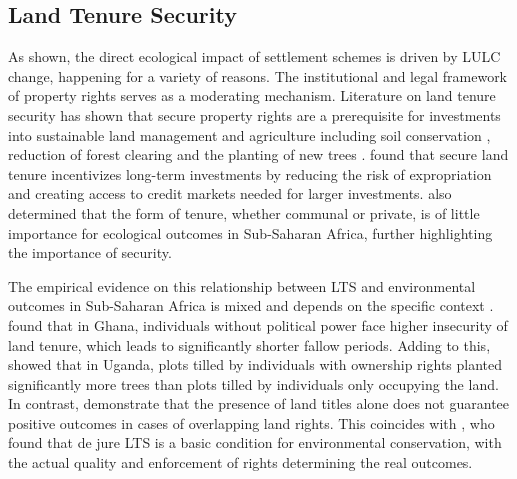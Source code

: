 \subsection{Land Tenure Security}

As shown, the direct ecological impact of settlement schemes is driven by LULC change, happening for a variety of reasons.
The institutional and legal framework of property rights serves as a moderating mechanism.
Literature on land tenure security has shown that secure property rights are a prerequisite for investments into sustainable land management and agriculture including soil conservation \parencite{aliEnvironmentalGenderImpacts2014},
reduction of forest clearing \parencite{robinsonDoesSecureLand2014} and the planting of new trees \parencite{besleyLandReformPoverty2000, deiningerOverlappingLandRights2008}.
\cite{besleyLandReformPoverty2000} found that secure land tenure incentivizes long-term investments by reducing the risk of expropriation and creating access to credit markets needed for larger investments.
\cite{robinsonDoesSecureLand2014} also determined that the form of tenure, whether communal or private, is of little importance for ecological outcomes in Sub-Saharan Africa, further highlighting the importance of security.

The empirical evidence on this relationship between LTS and environmental outcomes in Sub-Saharan Africa is mixed and depends on the specific context \parencite{tsengInfluenceLandTenure2020,noufeImpactLandTenure2023}.
\cite{goldsteinProfitsPowerLand2008} found that in Ghana, individuals without political power face higher insecurity of land tenure, which leads to significantly shorter fallow periods.
Adding to this, \cite{deiningerOverlappingLandRights2008} showed that in Uganda, plots tilled by individuals with ownership rights planted significantly more trees than plots tilled by individuals only occupying the land.
In contrast, \cite{deiningerOverlappingLandRights2008} demonstrate that the presence of land titles alone does not guarantee positive outcomes in cases of overlapping land rights.
This coincides with \cite{naughton-trevesLandTenureTropical2014}, who found that de jure LTS is a basic condition for environmental conservation, with the actual quality and enforcement of rights determining the real outcomes.

